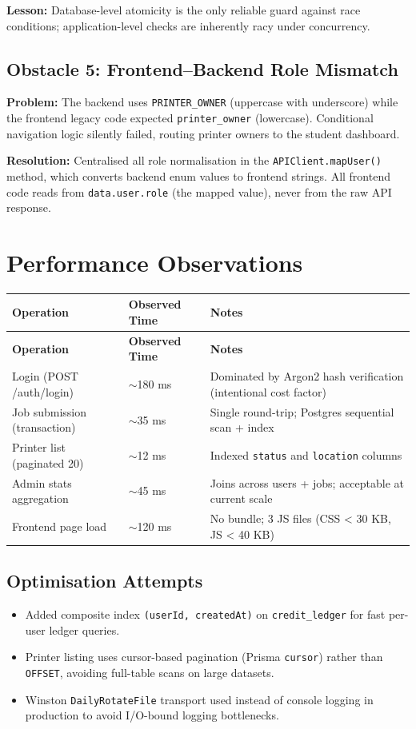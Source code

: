 \documentclass[12pt,a4paper]{report}
\begin{document}
\textbf{Lesson:} Database-level atomicity is the only reliable guard against race conditions;
application-level checks are inherently racy under concurrency.

\subsection{Obstacle 5: Frontend–Backend Role Mismatch}

\textbf{Problem:} The backend uses \texttt{PRINTER\_OWNER} (uppercase with underscore) while
the frontend legacy code expected \texttt{printer\_owner} (lowercase). Conditional navigation
logic silently failed, routing printer owners to the student dashboard.

\textbf{Resolution:} Centralised all role normalisation in the \texttt{APIClient.mapUser()}
method, which converts backend enum values to frontend strings. All frontend code reads from
\texttt{data.user.role} (the mapped value), never from the raw API response.

\section{Performance Observations}

\begin{longtable}{L{4.5cm} C{3cm} L{6cm}}
  \toprule
  \textbf{Operation} & \textbf{Observed Time} & \textbf{Notes} \\
  \midrule
  \endfirsthead
  \midrule
  \textbf{Operation} & \textbf{Observed Time} & \textbf{Notes} \\
  \midrule
  \endhead
  \bottomrule
  \endfoot
  Login (POST /auth/login) & $\sim$180 ms & Dominated by Argon2 hash verification (intentional cost factor) \\
  Job submission (transaction) & $\sim$35 ms & Single round-trip; Postgres sequential scan + index \\
  Printer list (paginated 20) & $\sim$12 ms & Indexed \texttt{status} and \texttt{location} columns \\
  Admin stats aggregation & $\sim$45 ms & Joins across users + jobs; acceptable at current scale \\
  Frontend page load & $\sim$120 ms & No bundle; 3 JS files (CSS < 30 KB, JS < 40 KB) \\
\end{longtable}

\subsection{Optimisation Attempts}
\begin{itemize}
  \item Added composite index \texttt{(userId, createdAt)} on \texttt{credit\_ledger} for
    fast per-user ledger queries.
  \item Printer listing uses cursor-based pagination (Prisma \texttt{cursor}) rather than
    \texttt{OFFSET}, avoiding full-table scans on large datasets.
  \item Winston \texttt{DailyRotateFile} transport used instead of console logging in
    production to avoid I/O-bound logging bottlenecks.
\end{itemize}
\end{document}
